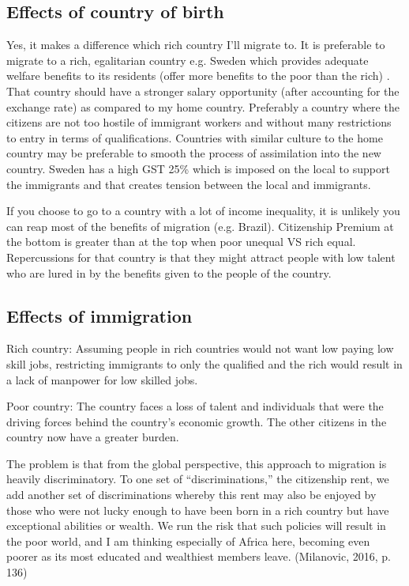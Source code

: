\documentclass[11pt]{article}
\begin{document}
\subsection{Effects of country of birth}
Yes, it makes a difference which rich country I’ll migrate to.
It is preferable to migrate to a rich, egalitarian country e.g. Sweden which provides adequate welfare benefits to its residents (offer more benefits to the poor than the rich) . That country should have a stronger salary opportunity (after accounting for the exchange rate) as compared to my home country. Preferably a country where the citizens are not too hostile of immigrant workers and without many restrictions to entry in terms of qualifications.
Countries with similar culture to the home country may be preferable to smooth the process of assimilation into the new country.
Sweden has a high GST 25\% which is imposed on the local to support the immigrants and that creates tension between the local and immigrants.

If you choose to go to a country with a lot of income inequality, it is unlikely you can reap most of the benefits of migration (e.g. Brazil). Citizenship Premium at the bottom is greater than at the top when poor unequal VS rich equal. Repercussions for that country is that they might attract people with low talent who are lured in by the benefits given to the people of the country.
\subsection{Effects of immigration}


Rich country:
Assuming people in rich countries would not want low paying low skill jobs, restricting immigrants to only the qualified and the rich would result in a lack of manpower for low skilled jobs.

Poor country:
The country faces a loss of talent and individuals that were the driving forces behind the country’s economic growth. The other citizens in the country now have a greater burden.


The problem is that from the global perspective, this approach to migration is heavily discriminatory. To one set of “discriminations,” the citizenship rent, we add another set of discriminations whereby this rent may also be enjoyed by those who were not lucky enough to have been born in a rich country but have exceptional abilities or wealth. We run the risk that such policies will result in the poor world, and I am thinking especially of Africa here, becoming even poorer as its most educated and wealthiest members leave. (Milanovic, 2016, p. 136)
\end{document}
